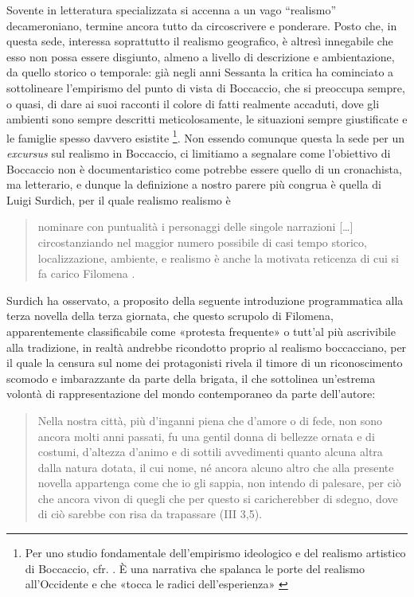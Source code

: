 Sovente in letteratura specializzata si accenna a un vago ``realismo''
decameroniano, termine ancora tutto da circoscrivere e ponderare. Posto
che, in questa sede, interessa soprattutto il realismo geografico, è
altresì innegabile che esso non possa essere disgiunto, almeno a livello
di descrizione e ambientazione, da quello storico o temporale: già negli
anni Sessanta la critica ha cominciato a sottolineare l'empirismo del
punto di vista di Boccaccio, che si preoccupa sempre, o quasi, di dare
ai suoi racconti il colore di fatti realmente accaduti, dove gli
ambienti sono sempre descritti meticolosamente, le situazioni sempre
giustificate e le famiglie spesso davvero esistite \footnote{Per uno
  studio fondamentale dell'empirismo ideologico e del realismo artistico
  di Boccaccio, cfr. \autocite[pp.~6-22]{1966decameron}. È una narrativa
  che spalanca le porte del realismo all'Occidente e che «tocca le
  radici dell'esperienza» \autocite[p.~229]{battaglia1993}}. Non essendo
comunque questa la sede per un \emph{excursus} sul realismo in
Boccaccio, ci limitiamo a segnalare come l'obiettivo di Boccaccio non è
documentaristico come potrebbe essere quello di un cronachista, ma
letterario, e dunque la definizione a nostro parere più congrua è quella
di Luigi Surdich, per il quale realismo realismo è

\begin{quote}
nominare con puntualità i personaggi delle singole narrazioni
{[}\ldots{}{]} circostanziando nel maggior numero possibile di casi
tempo storico, localizzazione, ambiente, e realismo è anche la motivata
reticenza di cui si fa carico Filomena
\autocite[p.~96]{surdich2008boccaccio}.
\end{quote}

Surdich ha osservato, a proposito della seguente introduzione
programmatica alla terza novella della terza giornata, che questo
scrupolo di Filomena, apparentemente classificabile come «protesta
frequente» \autocite[p.~347]{brancadecameron} o tutt'al più ascrivibile
alla tradizione, in realtà andrebbe ricondotto proprio al realismo
boccacciano, per il quale la censura sul nome dei protagonisti rivela il
timore di un riconoscimento scomodo e imbarazzante da parte della
brigata, il che sottolinea un'estrema volontà di rappresentazione del
mondo contemporaneo da parte dell'autore:

\begin{quote}
Nella nostra città, più d'inganni piena che d'amore o di fede, non sono
ancora molti anni passati, fu una gentil donna di bellezze ornata e di
costumi, d'altezza d'animo e di sottili avvedimenti quanto alcuna altra
dalla natura dotata, il cui nome, né ancora alcuno altro che alla
presente novella appartenga come che io gli sappia, non intendo di
palesare, per ciò che ancora vivon di quegli che per questo si
caricherebber di sdegno, dove di ciò sarebbe con risa da trapassare (III
3,5).
\end{quote}


